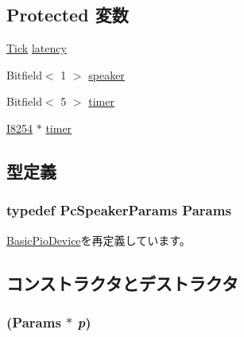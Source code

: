 \subsection*{Protected 変数}
\begin{DoxyCompactItemize}
\item 
\hyperlink{base_2types_8hh_a5c8ed81b7d238c9083e1037ba6d61643}{Tick} \hyperlink{classX86ISA_1_1Speaker_ac8d8966078cc047949fd1bca8feb21b6}{latency}
\item 
Bitfield$<$ 1 $>$ \hyperlink{classX86ISA_1_1Speaker_a3791b579002f3ffc8a2752a2d711e46e}{speaker}
\item 
Bitfield$<$ 5 $>$ \hyperlink{classX86ISA_1_1Speaker_a0d840ef312b28548436ba3651064f023}{timer}
\item 
\hyperlink{classX86ISA_1_1I8254}{I8254} $\ast$ \hyperlink{classX86ISA_1_1Speaker_aab951a332e224dfaad6bf461353dc1ce}{timer}
\end{DoxyCompactItemize}


\subsection{型定義}
\hypertarget{classX86ISA_1_1Speaker_ae21f9523ca3e32b9fd40e1e647ebd365}{
\subsubsection[{Params}]{\setlength{\rightskip}{0pt plus 5cm}typedef PcSpeakerParams {\bf Params}}}
\label{classX86ISA_1_1Speaker_ae21f9523ca3e32b9fd40e1e647ebd365}


\hyperlink{classBasicPioDevice_a2845515ac6467f10540747053c8a0449}{BasicPioDevice}を再定義しています。

\subsection{コンストラクタとデストラクタ}
\hypertarget{classX86ISA_1_1Speaker_ab5b969b360baf10e8afbe38ca5e18b59}{
\subsubsection[{Speaker}]{ ({\bf Params} $\ast$ {\em p})}}
\label{classX86ISA_1_1Speaker_ab5b969b360baf10e8afbe38ca5e18b59}



